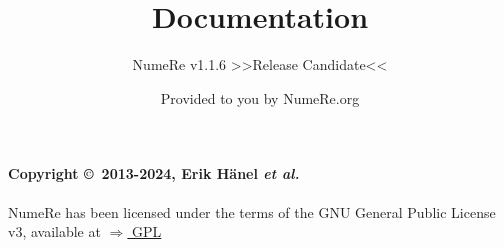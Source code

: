 \documentclass[DIV=17, parskip=half]{scrreprt}
\title{Documentation}
\subtitle{NumeRe v1.1.6 >>Release Candidate<<}
\date{}
\author{\small Provided to you by NumeRe.org}
\begin{document}
    \maketitle
% 
% 
	\tableofcontents
		\paragraph{Copyright \copyright\ 2013-2024, Erik H\"anel \emph{et al.}} 
		NumeRe has been licensed under the terms of the GNU General Public License v3, available at \href{http://www.gnu.org/licenses/gpl.html}{$\Rightarrow$ GPL}
\end{document}

